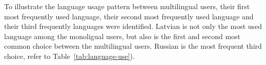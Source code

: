 \documentclass[11pt,a4paper]{article}
\begin{document}
To illustrate the language usage pattern between multilingual users, their first most frequently used language, their second most frequently used language and their third frequently languages were identified. Latvian is not only the most used language among the monoligual users, but also is the first and second most common choice between the multilingual users. Russian is the most frequent third choice, refer to Table~\ref{tab:language-use}).





\end{document}
